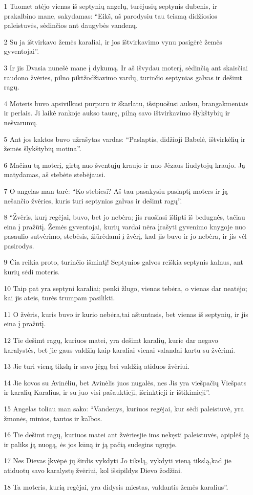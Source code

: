 \par 1 Tuomet atėjo vienas iš septynių angelų, turėjusių septynis dubenis, ir prakalbino mane, sakydamas: “Eikš, aš parodysiu tau teismą didžiosios paleistuvės, sėdinčios ant daugybės vandenų. 
\par 2 Su ja ištvirkavo žemės karaliai, ir jos ištvirkavimo vynu pasigėrė žemės gyventojai”. 
\par 3 Ir jis Dvasia nunešė mane į dykumą. Ir aš išvydau moterį, sėdinčią ant skaisčiai raudono žvėries, pilno piktžodžiavimo vardų, turinčio septynias galvas ir dešimt ragų. 
\par 4 Moteris buvo apsivilkusi purpuru ir škarlatu, išsipuošusi auksu, brangakmeniais ir perlais. Ji laikė rankoje aukso taurę, pilną savo ištvirkavimo šlykštybių ir nešvarumų. 
\par 5 Ant jos kaktos buvo užrašytas vardas: “Paslaptis, didžioji Babelė, ištvirkėlių ir žemės šlykštybių motina”. 
\par 6 Mačiau tą moterį, girtą nuo šventųjų kraujo ir nuo Jėzaus liudytojų kraujo. Ją matydamas, aš stebėte stebėjausi. 
\par 7 O angelas man tarė: “Ko stebiesi? Aš tau pasakysiu paslaptį moters ir ją nešančio žvėries, kuris turi septynias galvas ir dešimt ragų”. 
\par 8 “Žvėris, kurį regėjai, buvo, bet jo nebėra; jis ruošiasi išlipti iš bedugnės, tačiau eina į pražūtį. Žemės gyventojai, kurių vardai nėra įrašyti gyvenimo knygoje nuo pasaulio sutvėrimo, stebėsis, žiūrėdami į žvėrį, kad jis buvo ir jo nebėra, ir jis vėl pasirodys. 
\par 9 Čia reikia proto, turinčio išmintį! Septynios galvos reiškia septynis kalnus, ant kurių sėdi moteris. 
\par 10 Taip pat yra septyni karaliai; penki žlugo, vienas tebėra, o vienas dar neatėjo; kai jis ateis, turės trumpam pasilikti. 
\par 11 O žvėris, kuris buvo ir kurio nebėra,­tai aštuntasis, bet vienas iš septynių, ir jis eina į pražūtį. 
\par 12 Tie dešimt ragų, kuriuos matei, yra dešimt karalių, kurie dar negavo karalystės, bet jie gaus valdžią kaip karaliai vienai valandai kartu su žvėrimi. 
\par 13 Jie turi vieną tikslą ir savo jėgą bei valdžią atiduos žvėriui. 
\par 14 Jie kovos su Avinėliu, bet Avinėlis juos nugalės, nes Jis yra viešpačių Viešpats ir karalių Karalius, ir su juo visi pašauktieji, išrinktieji ir ištikimieji”. 
\par 15 Angelas toliau man sako: “Vandenys, kuriuos regėjai, kur sėdi paleistuvė, yra žmonės, minios, tautos ir kalbos. 
\par 16 Tie dešimt ragų, kuriuos matei ant žvėries­jie ims nekęsti paleistuvės, apiplėš ją ir paliks ją nuogą, ės jos kūną ir ją pačią sudegins ugnyje. 
\par 17 Nes Dievas įkvėpė jų širdis vykdyti Jo tikslą, vykdyti vieną tikslą,­kad jie atiduotų savo karalystę žvėriui, kol išsipildys Dievo žodžiai. 
\par 18 Ta moteris, kurią regėjai, yra didysis miestas, valdantis žemės karalius”.


